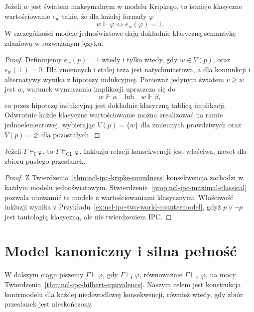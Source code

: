 \begin{stwierdzenie}
\label{prop:ncl-ipc-maximal-classical}
Jeżeli $w$ jest światem maksymalnym w modelu Kripkego,
to istnieje klasyczne wartościowanie $e_w$ takie, że
dla każdej formuły $\varphi$
\[
 w\Vdash\varphi\iff e_w(\varphi)=1.
\]
W szczególności modele jednoświatowe dają dokładnie
klasyczną semantykę zdaniową w rozważanym języku.
\end{stwierdzenie}
\begin{proof}
Definiujemy $e_w(p)=1$ wtedy i tylko wtedy,
gdy $w\in V(p)$, oraz $e_w(\bot)=0$.
Dla zmiennych i stałej teza jest natychmiastowa,
a dla koniunkcji i alternatywy wynika z hipotezy
indukcyjnej. Ponieważ jedynym światem $v\geq w$
jest $w$, warunek wymuszania implikacji upraszcza
się do
\[
 w\not\Vdash\alpha\quad\text{lub}\quad w\Vdash\beta,
\]
co przez hipotezę indukcyjną jest dokładnie
klasyczną tablicą implikacji.
Odwrotnie każde klasyczne wartościowanie można
zrealizować na ramie jednoelementowej, wybierając
$V(p)=\{w\}$ dla zmiennych prawdziwych oraz
$V(p)=\varnothing$ dla pozostałych.
\end{proof}

\begin{wniosek}
\label{cor:ncl-ipc-classical-inclusion}
Jeżeli $\Gamma\vdash_{\mathrm I}\varphi$,
to $\Gamma\models_{\mathrm{CL}}\varphi$.
Inkluzja relacji konsekwencji jest właściwa,
nawet dla zbioru pustego przesłanek.
\end{wniosek}
\begin{proof}
Z Twierdzenia~\ref{thm:ncl-ipc-kripke-soundness}
konsekwencja zachodzi w każdym modelu jednoświatowym.
Stwierdzenie~\ref{prop:ncl-ipc-maximal-classical}
pozwala utożsamić te modele z wartościowaniami
klasycznymi. Właściwość inkluzji wynika z
Przykładu~\ref{ex:ncl-ipc-two-world-countermodel},
gdyż $p\vee\neg p$ jest tautologią klasyczną,
ale nie twierdzeniem IPC.
\end{proof}

\section{Model kanoniczny i silna pełność}

W dalszym ciągu piszemy $\Gamma\vdash\varphi$,
gdy $\Gamma\vdash_{\mathrm I}\varphi$, równoważnie
$\Gamma\vdash_{\mathrm H}\varphi$, na mocy
Twierdzenia~\ref{thm:ncl-ipc-hilbert-equivalence}.
Naszym celem jest konstrukcja kontrmodelu dla każdej
niedowodliwej konsekwencji, również wtedy, gdy
zbiór przesłanek jest nieskończony.

